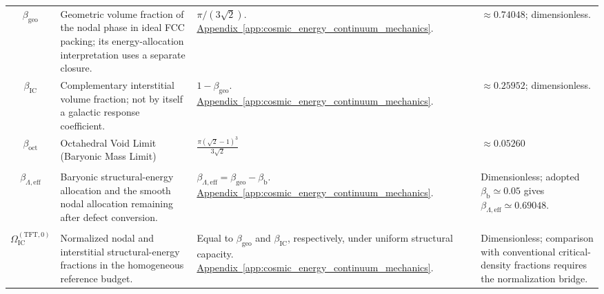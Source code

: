 \begin{longtable}{@{} c p{5.5cm} p{4cm} p{3.5cm} @{}}
$\beta_{\mathrm{geo}}$ & {\raggedright Geometric volume fraction of the nodal phase in ideal FCC packing; its energy-allocation interpretation uses a separate closure.\par} & {\raggedright $\pi/(3\sqrt2)$. \newline \hyperref[app:cosmic_energy_continuum_mechanics]{Appendix~\ref*{app:cosmic_energy_continuum_mechanics}}.\par} & {\raggedright $\approx0.74048$; dimensionless.\par} \\

$\beta_{\mathrm{IC}}$ & {\raggedright Complementary interstitial volume fraction; not by itself a galactic response coefficient.\par} & {\raggedright $1-\beta_{\mathrm{geo}}$. \newline \hyperref[app:cosmic_energy_continuum_mechanics]{Appendix~\ref*{app:cosmic_energy_continuum_mechanics}}.\par} & {\raggedright $\approx0.25952$; dimensionless.\par} \\

$\beta_{\mathrm{oct}}$ & Octahedral Void Limit (Baryonic Mass Limit) & $\frac{\pi(\sqrt{2}-1)^3}{3\sqrt{2}}$ & $\approx 0.05260$ \\

\begin{tabular}[c]{@{}c@{}}$\beta_{\mathrm b}$ \\ $\beta_{\Lambda,\mathrm{eff}}$\end{tabular} & {\raggedright Baryonic structural-energy allocation and the smooth nodal allocation remaining after defect conversion.\par} & {\raggedright $\beta_{\Lambda,\mathrm{eff}}=\beta_{\mathrm{geo}}-\beta_{\mathrm b}$. \newline \hyperref[app:cosmic_energy_continuum_mechanics]{Appendix~\ref*{app:cosmic_energy_continuum_mechanics}}.\par} & {\raggedright Dimensionless; adopted $\beta_{\mathrm b}\simeq0.05$ gives $\beta_{\Lambda,\mathrm{eff}}\simeq0.69048$.\par} \\

\begin{tabular}[c]{@{}c@{}}$\Omega_{\mathrm D}^{(\mathrm{TFT},0)}$ \\ $\Omega_{\mathrm{IC}}^{(\mathrm{TFT},0)}$\end{tabular} & {\raggedright Normalized nodal and interstitial structural-energy fractions in the homogeneous reference budget.\par} & {\raggedright Equal to $\beta_{\mathrm{geo}}$ and $\beta_{\mathrm{IC}}$, respectively, under uniform structural capacity. \newline \hyperref[app:cosmic_energy_continuum_mechanics]{Appendix~\ref*{app:cosmic_energy_continuum_mechanics}}.\par} & {\raggedright Dimensionless; comparison with conventional critical-density fractions requires the normalization bridge.\par} \\



\end{longtable}
